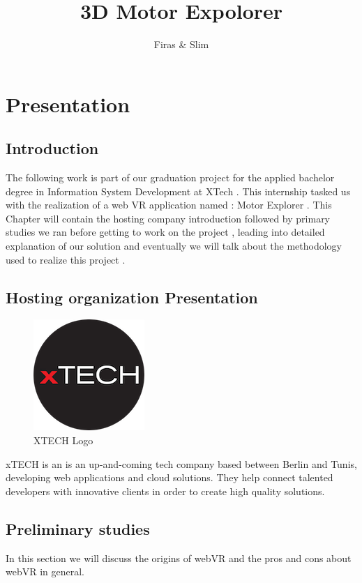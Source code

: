 \documentclass[]{report}
\title{3D Motor Expolorer}
\author{Firas \& Slim}
\begin{document}
\maketitle
\tableofcontents
\listoffigures
\listoftables

\newpage
\chapter{Presentation}
\section{Introduction}
 The following work is part of our graduation project for the applied bachelor
	degree in Information System Development at XTech . This internship tasked us
	with the realization of a web VR application named : Motor Explorer .
	This Chapter will contain the hosting company introduction followed by
	primary studies we ran before getting to work on the project , leading into
	detailed explanation of our solution and eventually we will talk about the
	methodology used to realize this project .

\section{Hosting organization Presentation}
\begin{figure}[H]
	\begin{center}
	\includegraphics[scale=0.5]{XTECHLogo.png}
	\caption{XTECH Logo}
	\end{center}
\end{figure} \par



xTECH is an is an up-and-coming tech company based between Berlin and Tunis, developing web applications and cloud solutions. They help connect talented developers with innovative clients in order to create high quality solutions.\par


\section{Preliminary studies}
In this section we will discuss the origins of webVR and the pros and cons
about webVR in general.
\end{document}
